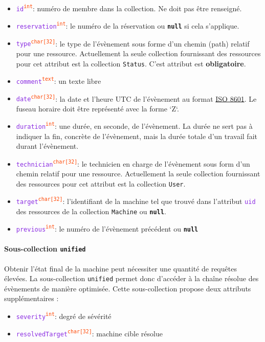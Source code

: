 \documentclass[a4paper,twoside]{article}
\newcommand{\collection}[1]{\colorbox{light-gray}{\texttt{#1}}}
\newcommand{\attribut}[1]{\textcolor{BlueViolet}{\texttt{#1}}}
\newcommand{\type}[1]{\textcolor{OrangeRed}{\textsuperscript{\texttt{#1}}}}
\newcommand{\valeur}[1]{\texttt{{\bf #1}}}
\begin{document}
\begin{itemize}
  \item \attribut{id}\type{int}: numéro de membre dans la collection. Ne doit pas être renseigné.
  \item \attribut{reservation}\type{int}: le numéro de la réservation ou \valeur{null} si cela s'applique.
  \item \attribut{type}\type{char[32]}: le type de l'évènement sous forme d'un chemin (path) relatif pour une ressource. Actuellement la seule collection fournissant des ressources pour cet attribut est la collection \collection{Status}. C'est attribut est {\bf obligatoire}.
  \item \attribut{comment}\type{text}: un texte libre
  \item \attribut{date}\type{char[32]}: la date et l'heure UTC de l'évènement au format \href{https://en.wikipedia.org/wiki/ISO_8601}{ISO 8601}. Le fuseau horaire doit être représenté avec la forme `Z`.
  \item \attribut{duration}\type{int}: une durée, en seconde, de l'évènement. La durée ne sert pas à indiquer la fin, concrète de l'évènement, mais la durée totale d'un travail fait durant l'évènement.
  \item \attribut{technician}\type{char[32]}: le technicien en charge de l'évènement sous form d'un chemin relatif pour une ressource. Actuellement la seule collection fournissant des ressources pour cet attribut est la collection \collection{User}.
  \item \attribut{target}\type{char[32]}: l'identifiant de la machine tel que trouvé dans l'attribut \attribut{uid} des ressources de la collection \collection{Machine} ou \valeur{null}.
  \item \attribut{previous}\type{int}: le numéro de l'évènement précédent ou \valeur{null}
\end{itemize}

\paragraph{Sous-collection \collection{unified}} Obtenir l'état final de la machine peut nécessiter une quantité de requêtes élevées. La sous-collection \collection{unified} permet donc d'accéder à la chaîne résolue des évènements de manière optimisée. Cette sous-collection propose deux attributs supplémentaires :

\begin{itemize}
  \item \attribut{severity}\type{int}: degré de sévérité
  \item \attribut{resolvedTarget}\type{char[32]}: machine cible résolue
\end{itemize}
\end{document}
